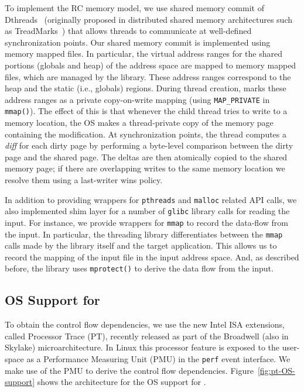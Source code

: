  To implement the RC memory model, we use shared memory commit of  Dthreads~\cite{dthreads-sosp-2011} (originally proposed in distributed shared memory architectures such as TreadMarks~\cite{treadmark}) %
that allows threads to communicate at well-defined synchronization points.
Our shared memory commit is implemented using memory mapped files. In
particular, the virtual address ranges for the shared portions (globals and heap) of
the address space are mapped to memory mapped files, which are managed by the
\projecttitle library. These address ranges correspond to the heap and
the static (i.e., globals) regions.  During thread creation,
\projecttitle marks these address ranges as a private copy-on-write
mapping (using {\tt MAP\_PRIVATE} in {\tt mmap()}). The effect of this
is that whenever the child thread tries to write to a memory location,
the OS makes a thread-private copy of the memory page containing the
modification.  At synchronization points, the thread computes a {\em diff}
for each dirty page by performing a byte-level comparison between the
dirty page and the shared page. The deltas are then atomically
copied to the shared memory page; if there are overlapping writes
to the same memory location we resolve them using a last-writer wins policy.


 In addition to providing wrappers for {\tt pthreads} and {\tt malloc} related API calls, we also implemented shim layer for a number of {\tt glibc} library calls for reading the input. For instance, we provide wrappers for {\tt mmap} to record the data-flow from the input. In particular, the threading library differentiates between the {\tt mmap} calls made by the library itself and the target application. This allows us to record the mapping of the input file in the input address space. And, as described before, the library uses {\tt mprotect()} to derive the data flow from the input. 


\subsection{OS Support for \intelpt}

To obtain the control flow dependencies, we use the new Intel ISA extensions, called Processor Trace (PT), recently released as part of the Broadwell (also in Skylake) microarchitecture. In Linux this processor feature is exposed to the user-space as a Performance Measuring Unit (PMU) in the {\tt perf} event interface. We make use of the \intelpt PMU to derive the control flow dependencies. Figure~\ref{fig:pt-OS-support} shows the architecture for the OS support for \intelpt.

